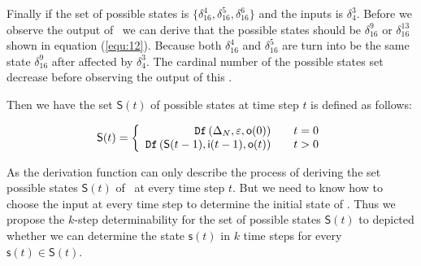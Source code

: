 \begin{example}
 Finally if the set of possible states is $\{\delta_{16}^4,\delta_{16}^5,\delta_{16}^6\}$ and the inputs is $\delta_4^3$. Before we observe the output of \BCN\ we can derive that the possible states should be $\delta_{16}^9$ or $\delta_{16}^{13}$ shown in equation (\ref{equ:12}). Because both $\delta_{16}^4$ and $\delta_{16}^5$ are turn into be the same state $\delta_{16}^9$ after affected by $\delta_4^3$. The cardinal number of the possible states set decrease before observing the output of this \BCN.%
 \end{example}   
 
 Then we have the set $\mathsf{S}(t)$ of possible states at time step $t$ is defined as follows:
 \begin{definition}[$\mathsf{S}(t)$]
	\[\mathsf{S}(t)=\left\{
\begin{array}{rcl}
{\tt Df}\left(\Delta_N,\varepsilon,\mathsf{o}(0)\right)      &      & {t=0}\\
{\tt Df}\left(\mathsf{S}(t-1),\mathsf{i}(t-1),\mathsf{o}(t)\right)       &      & {t>0}
\end{array} \right. \]
\end{definition}
 
 As the derivation function can only describe the process of deriving the set possible states $\mathsf{S}(t)$ of \BCNs\ at every time step $t$. But we need to know how to choose the input at every time step to determine the initial state of \BCNs. Thus we propose the $k$-step determinability for the set of possible states $\mathsf{S}(t)$ to depicted whether we can determine the state $\mathsf{s}(t)$ in $k$ time steps for every $\mathsf{s}(t)\in \mathsf{S}(t)$.
